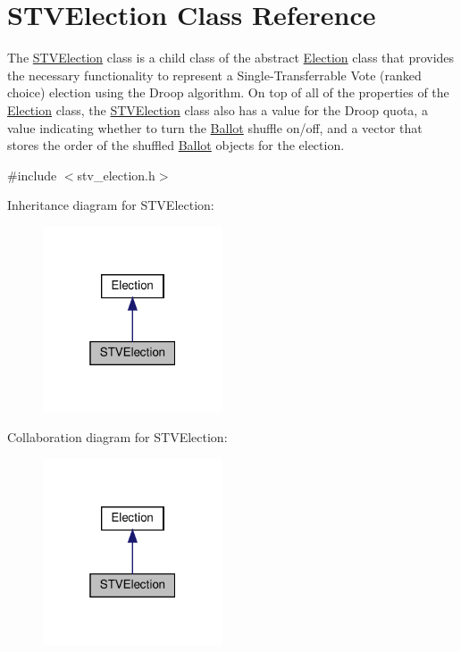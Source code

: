 \hypertarget{classSTVElection}{}\section{S\+T\+V\+Election Class Reference}
\label{classSTVElection}


The \hyperlink{classSTVElection}{S\+T\+V\+Election} class is a child class of the abstract \hyperlink{classElection}{Election} class that provides the necessary functionality to represent a Single-\/\+Transferrable Vote (ranked choice) election using the Droop algorithm. On top of all of the properties of the \hyperlink{classElection}{Election} class, the \hyperlink{classSTVElection}{S\+T\+V\+Election} class also has a value for the Droop quota, a value indicating whether to turn the \hyperlink{classBallot}{Ballot} shuffle on/off, and a vector that stores the order of the shuffled \hyperlink{classBallot}{Ballot} objects for the election.  




{\ttfamily \#include $<$stv\+\_\+election.\+h$>$}



Inheritance diagram for S\+T\+V\+Election\+:\nopagebreak
\begin{figure}[H]
\begin{center}
\leavevmode
\includegraphics[width=151pt]{classSTVElection__inherit__graph}
\end{center}
\end{figure}


Collaboration diagram for S\+T\+V\+Election\+:\nopagebreak
\begin{figure}[H]
\begin{center}
\leavevmode
\includegraphics[width=151pt]{classSTVElection__coll__graph}
\end{center}
\end{figure}
